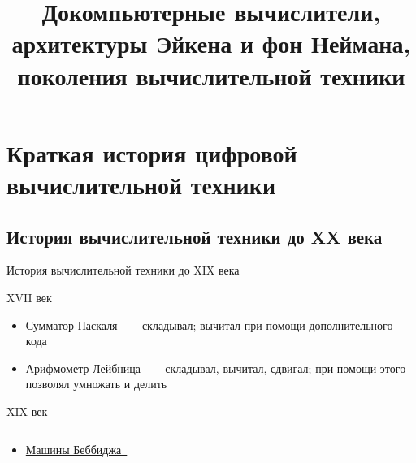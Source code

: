 \documentclass[xetex,aspectratio=43]{beamer}
\title[Докомпьютерные, Эйкен, фон Нейман]{Докомпьютерные вычислители,\\ архитектуры Эйкена и фон Неймана,\\поколения вычислительной техники}
\begin{document}
\titleslide

\tocslide

\section{Краткая история цифровой
		вычислительной техники}

\subsection{История вычислительной техники до XX века}

\begin{frame}{История вычислительной техники до XIX века}
	\begin{block}{XVII век}
		\begin{itemize}
			\item
			\href{https://en.wikipedia.org/wiki/Pascal\%27s_calculator\#Addition}{Сумматор
				Паскаля~\extlink} --- складывал; вычитал при помощи дополнительного кода
			\item
			\href{https://en.wikipedia.org/wiki/Stepped_reckoner\#Operation}{Арифмометр
				Лейбница~\extlink} --- складывал, вычитал, сдвигал; при помощи этого позволял
			умножать и делить
		\end{itemize}
	\end{block}

	\pause

	\begin{block}{XIX век}
		\begin{columns}
		\begin{column}{0.7\textwidth}
			\begin{itemize}
				\item
				\href{https://en.wikipedia.org/wiki/Charles_Babbage\#Computing_pioneer}{Машины
					Беббиджа~\extlink}
	

\end{itemize}
\end{column}
\end{columns}
\end{block}
\end{frame}
\end{document}
